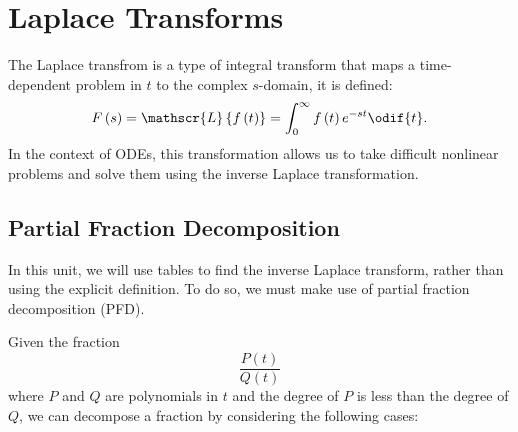 \documentclass{article}
\begin{document}
\newpage
\section{Laplace Transforms}
The Laplace transfrom is a type of integral transform that maps
a time-dependent problem in \(t\) to the complex \(s\)-domain, it is defined:
\begin{equation*}
    F\left( s \right) = \mathscr{L}\left\{ f\left( t \right) \right\} = \int_0^\infty f\left( t \right) e^{-st} \odif{t}.
\end{equation*}
In the context of ODEs, this transformation allows us to take difficult nonlinear problems and solve them
using the inverse Laplace transformation.
\subsection{Partial Fraction Decomposition}
In this unit, we will use tables to find the inverse Laplace transform, rather than using the
explicit definition. To do so, we must make use of partial fraction decomposition (PFD).

Given the fraction
\begin{equation*}
    \frac{P\left( t \right)}{Q\left( t \right)}
\end{equation*}
where \(P\) and \(Q\) are polynomials in \(t\) and the degree of \(P\) is less than the degree of \(Q\),
we can decompose a fraction by considering the following cases:
\end{document}
